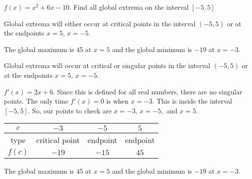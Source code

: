 \begin{question}
$f(x)=x^2+6x-10$.
Find all global extrema on the interval $[-5,5]$
\end{question}
\begin{hint}
Global extrema will either occur at critical points in the interval $(-5,5)$ or at the endpoints $x=5,\,x=-5$.
\end{hint}
\begin{answer}
The global maximum is 45 at $x=5$ and the global minimum is $-19$ at $x=-3$.
\end{answer}
\begin{solution}
Global extrema will occur at critical or singular points in the interval $(-5,5)$ or at the endpoints $x=5,\,x=-5$.

$f'(x)=2x+6$. Since this is defined for all real numbers, there are no singular points. The only time $f'(x)=0$ is when $x=-3$. This is inside the interval $[-5,5]$. So, our points to check are $x=-3,\,x=-5,$ and $x=5$.

\begin{center}
\begin{tabular}{|c||c|c|c|}
\hline
$c$ & $-3$ &  $-5$ &  $5$ \\
\hline
type & critical point & endpoint & endpoint  \\
\hline
$f(c)$ & $-19$ & $-15$ & $45$\\
\hline
\end{tabular}
\end{center}
The global maximum is 45 at $x=5$ and the global minimum is $-19$ at $x=-3$.
\end{solution}


